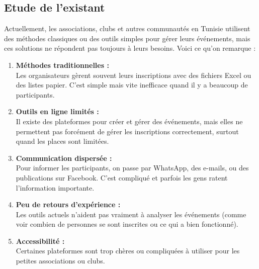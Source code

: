 \subsection{Etude de l'existant }
Actuellement, les associations, clubs et autres communautés en Tunisie utilisent des méthodes classiques ou des outils simples pour gérer leurs événements, mais ces solutions ne répondent pas toujours à leurs besoins. Voici ce qu’on remarque :
\begin{enumerate}
    \item \textbf{Méthodes traditionnelles :} \\
    Les organisateurs gèrent souvent leurs inscriptions avec des fichiers Excel ou des listes papier. C’est simple mais vite inefficace quand il y a beaucoup de participants.
    \item \textbf{Outils en ligne limités :} \\
    Il existe des plateformes pour créer et gérer des événements, mais elles ne permettent pas forcément de gérer les inscriptions correctement, surtout quand les places sont limitées.
    \item \textbf{Communication dispersée :} \\
    Pour informer les participants, on passe par WhatsApp, des e-mails, ou des publications sur Facebook. C’est compliqué et parfois les gens ratent l’information importante.
    \item \textbf{Peu de retours d’expérience :} \\
    Les outils actuels n’aident pas vraiment à analyser les événements (comme voir combien de personnes se sont inscrites ou ce qui a bien fonctionné).
    \item \textbf{Accessibilité :}  \\
    Certaines plateformes sont trop chères ou compliquées à utiliser pour les petites associations ou clubs.
\end{enumerate}

